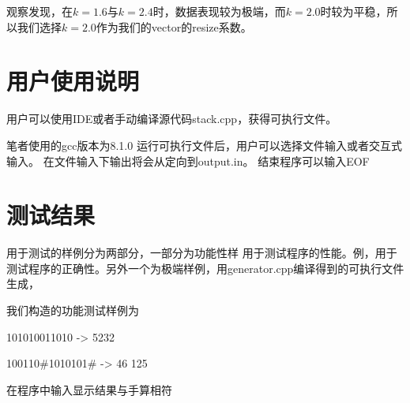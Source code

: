    观察发现，在$k=1.6$与$k=2.4$时，数据表现较为极端，而$k=2.0$时较为平稳，所以我们选择$k=2.0$作为我们的vector的resize系数。


\section{用户使用说明}
   用户可以使用IDE或者手动编译源代码stack.cpp，获得可执行文件。
      
   笔者使用的gcc版本为8.1.0
   运行可执行文件后，用户可以选择文件输入或者交互式输入。
   在文件输入下输出将会从定向到output.in。
   结束程序可以输入EOF

\section{测试结果}
   用于测试的样例分为两部分，一部分为功能性样
   用于测试程序的性能。例，用于测试程序的正确性。另外一个为极端样例，用generator.cpp编译得到的可执行文件生成，


   我们构造的功能测试样例为


   101010011010 -> 5232


   100110\#1010101\# -> 46 125


   在程序中输入显示结果与手算相符




